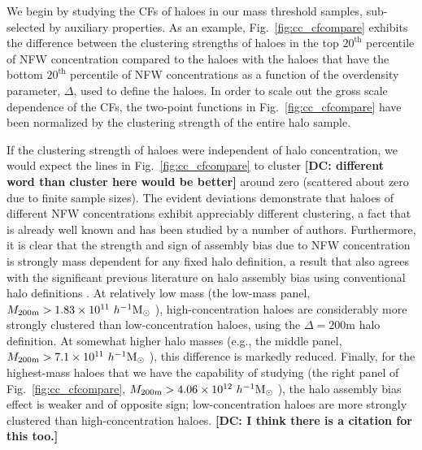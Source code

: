 \documentclass[usenatbib,fleqn]{mnras}
\begin{document}
We begin by studying the CFs of haloes in our mass threshold samples, sub-selected by auxiliary properties. As an example, Fig.~\ref{fig:cc_cfcompare} exhibits the difference between the clustering strengths of haloes in the top $20^{\mathrm{th}}$ percentile of NFW concentration compared to the haloes with the haloes that have the
bottom $20^{\mathrm{th}}$ percentile of NFW concentrations as a function of the overdensity parameter, $\Delta$, used to define the haloes. In order to scale out the gross scale dependence of the CFs, the two-point functions in Fig.~\ref{fig:cc_cfcompare} have been normalized by the clustering strength of the entire halo sample. 

If the clustering strength of haloes were independent of halo concentration, we would expect the lines in Fig.~\ref{fig:cc_cfcompare} to cluster {\bf [DC: different word than cluster here would be better]} around zero (scattered about zero due to finite sample sizes). The evident deviations demonstrate that haloes of different NFW concentrations exhibit appreciably different clustering, a fact that is already well known and has been studied by a number of authors. Furthermore, it is clear that the strength and sign of assembly bias due to NFW concentration is 
strongly mass dependent for any fixed halo definition, a result that also agrees with the significant previous literature on halo assembly bias using conventional halo definitions \citep{wechsler_etal02, gao_etal05, zentner07, wechsler_etal06, harker_etal06, croton_etal07, dalal_etal08, mao_etal15, sunayama_etal16}. At relatively low mass (the low-mass panel, $M_{200\text{m}} > 1.83 \times 10^{11} \ h^{-1}\mathrm{M}_{\odot}~$), high-concentration haloes are considerably more strongly clustered than low-concentration haloes, using the $\Delta = 200$m halo definition. At somewhat higher halo masses (e.g., the middle panel, $M_{200\text{m}} > 7.1 \times 10^{11} \ h^{-1}\mathrm{M}_{\odot}~$), this difference is markedly reduced. Finally, for the highest-mass haloes that we have the capability of studying (the right panel of Fig.~\ref{fig:cc_cfcompare}, $M_{200\text{m}} > 4.06 \times 10^{12} \ h^{-1}\mathrm{M}_{\odot}~$), the halo assembly bias effect is weaker and of opposite sign; low-concentration haloes are more strongly clustered than high-concentration haloes. {\bf [DC: I think there is a citation for this too.]}
\end{document}
